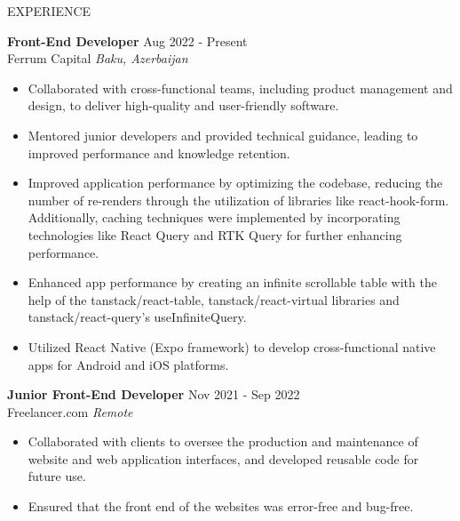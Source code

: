 \documentclass{resume} %
\begin{document}
\begin{rSection}{EXPERIENCE}

\textbf{Front-End Developer} \hfill Aug 2022 - Present\\
Ferrum Capital \hfill \textit{Baku, Azerbaijan}
 \begin{itemize}
    \itemsep -3pt {} 
     \item Collaborated with cross-functional teams, including product management and design, to deliver high-quality and user-friendly software.
     \item Mentored junior developers and provided technical guidance, leading to improved performance and knowledge retention.
    \item 
    Improved application performance by optimizing the codebase, reducing the number of re-renders through the utilization of libraries like react-hook-form. Additionally, caching techniques were implemented by incorporating technologies like React Query and RTK Query for further enhancing performance.
    \item Enhanced app performance by creating an infinite scrollable table with the help of the tanstack/react-table, tanstack/react-virtual libraries and tanstack/react-query's useInfiniteQuery. 
    \item Utilized React Native (Expo framework) to develop cross-functional native apps for Android and iOS platforms. 
 \end{itemize}
 
\textbf{Junior Front-End Developer} \hfill Nov 2021 - Sep 2022\\
Freelancer.com \hfill \textit{Remote}
 \begin{itemize}
    \itemsep -3pt {} 
     \item Collaborated with clients to oversee the production and maintenance of website and web application interfaces, and developed reusable code for future use.
     \item Ensured that the front end of the websites was error-free and bug-free.
 \end{itemize}

\end{rSection} 

\end{document}
